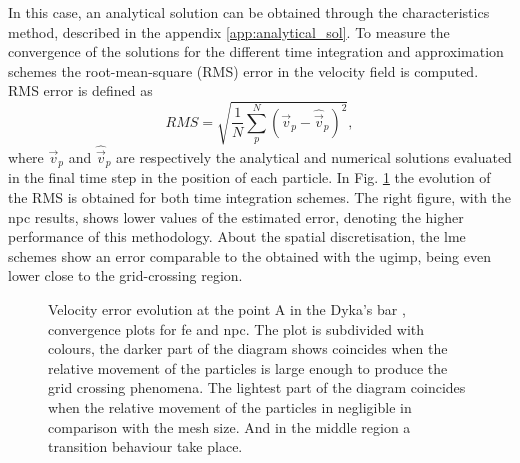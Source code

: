 \documentclass[preprint,12pt,a4paper]{elsarticle}
\begin{document}
In this case, an analytical solution can be obtained
through the characteristics method, described in the appendix
\ref{app:analytical_sol}. To measure the convergence of the solutions
for the different time integration and approximation schemes the
root-mean-square (RMS) error in the velocity field is computed. RMS
error is defined as
\begin{equation}
  \label{eq:RMS}
  RMS = \sqrt{\frac{1}{N} \sum^{N}_p \left( \vec{v}_p - \hat{\vec{v}}_p \right)^2},
\end{equation}
where $\vec{v}_p$ and $\hat{\vec{v}}_p$ are respectively the analytical and
numerical solutions evaluated in the final time step in the position
of each particle. In Fig. \ref{fig:Dyka-error-evol} the evolution of the RMS is obtained for both time integration schemes. The right figure, with the \acrshort{npc} results, shows lower values of the estimated error, denoting the higher performance of this methodology. About the spatial discretisation, the \acrshort{lme} schemes show an error comparable to the obtained with the \acrshort{ugimp}, being even lower close to the grid-crossing region.

\begin{figure}
  \centering
  \caption{Velocity error evolution at the point A in the Dyka's bar ,
    convergence plots for \acrshort{fe} and \acrshort{npc}. The plot is subdivided with
    colours, the darker part of the diagram shows coincides when the
    relative movement of the particles is large enough to produce the
    grid crossing phenomena. The lightest part of the diagram
    coincides when the relative movement of the particles in
    negligible in comparison with the mesh size. And in the middle
    region a transition behaviour take place.}
  \label{fig:Dyka-error-evol}
\end{figure}
\end{document}
